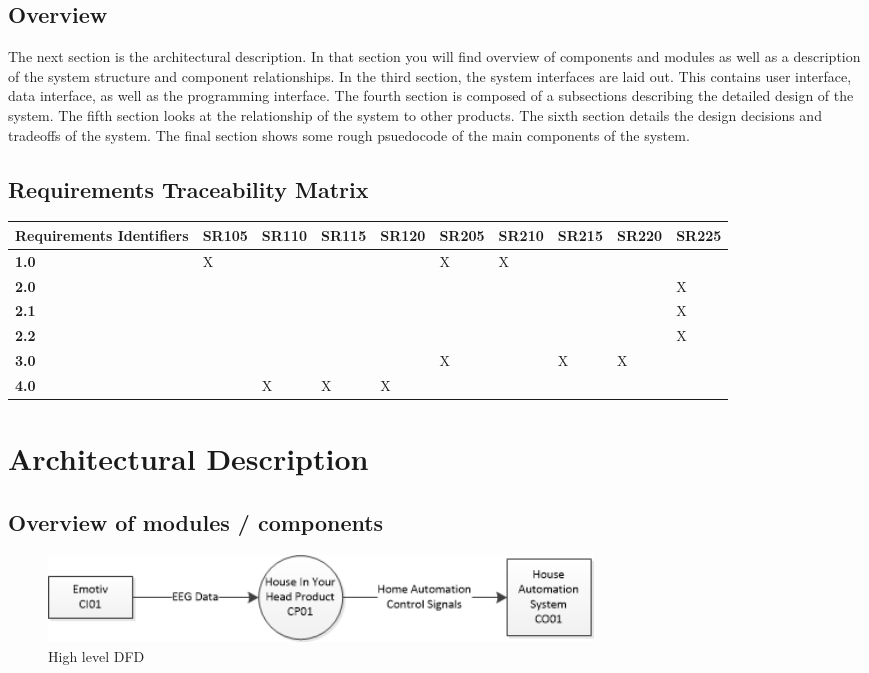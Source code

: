 \documentclass{article}
\begin{document}
\subsection{Overview}
The next section is the architectural description. In that section you will find overview of components and modules as well as a description of the system structure and component relationships. In the third section, the system interfaces are laid out. This contains user interface, data interface, as well as the programming interface. The fourth section is composed of a subsections describing the detailed design of the system. The fifth section looks at the relationship of the system to other products. The sixth section details the design decisions and tradeoffs of the system. The final section shows some rough psuedocode of the main components of the system.

\subsection{Requirements Traceability Matrix}
\begin{tabular}{ | l | l | l | l | l | l | l | l | l | l |}
\hline
\textbf{Requirements Identifiers} & SR105 & SR110 & SR115 & SR120 & SR205 & SR210 & SR215 & SR220 & SR225 \\ \hline
\textbf{1.0} & X &  &  &  & X & X &  &  & \\ \hline
\textbf{2.0} &  &  &  & &  &  &  &  & X \\ \hline
\textbf{2.1} &  &  &  & &  &  &  &  & X \\ \hline
\textbf{2.2} &  &  &  & &  &  &  &  & X \\ \hline
\textbf{3.0} &  &  &  &  & X &  & X & X & \\ \hline
\textbf{4.0} &  & X & X & X &  &  &  &  & \\ \hline
\end{tabular}

\newpage

\section{Architectural Description}

\subsection{Overview of modules / components}

\begin{figure}[h!]
	
  \centering
    \includegraphics[width=0.7\textwidth]{DFD1}
   \caption{High level DFD}
   \label{fig:dfd1}
\end{figure}
\end{document}
